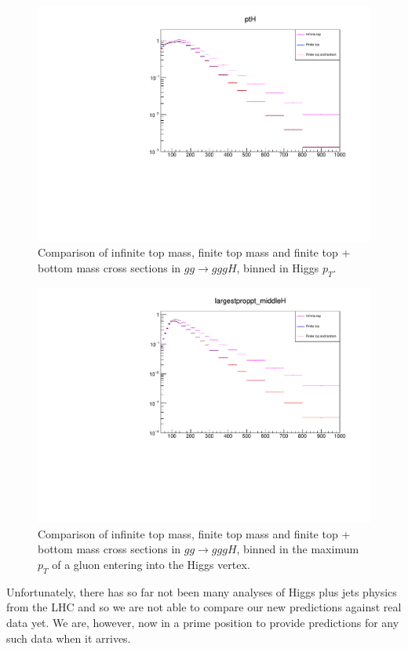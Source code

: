 \begin{figure}[t]
\centering
\includegraphics[scale=0.72]{Images/ptH_3j.pdf}
\caption{Comparison of infinite top mass, finite top mass and finite top + bottom mass cross sections in $gg \to gggH$, binned in Higgs $p_T$. }
\label{fig:pth_gg_gggH}
\end{figure}

\begin{figure}[t]
\centering
\includegraphics[scale=0.72]{Images/largestproppt.pdf}
\caption{Comparison of infinite top mass, finite top mass and finite top + bottom mass cross sections in $gg \to gggH$, binned in the maximum $p_T$ of a gluon entering into the Higgs vertex. }
\label{fig:maxprop}
\end{figure}

Unfortunately, there has so far not been many analyses of Higgs plus jets physics from the LHC and so we are not able to compare our new predictions against real data yet. We are, however, now in a prime position to provide predictions for any such data when it arrives. 


